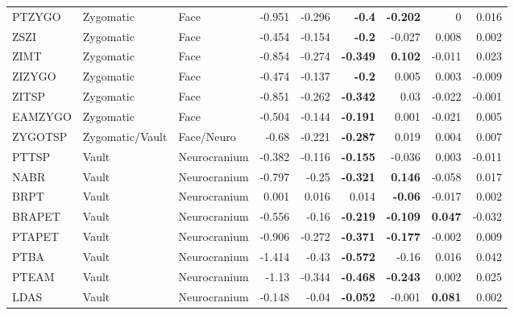 \documentclass [twocolumn, natbib, nospthms, 10pt] {svjour3}
\begin{document}
\begin{table*}[t]
\begin{tabular}{lllrrrrrr}
      PTZYGO & Zygomatic & Face & -0.951 & -0.296             & \textbf{-0.4}   & \textbf{-0.202} & 0              & 0.016            \\ 
      ZSZI & Zygomatic & Face & -0.454 & -0.154               & \textbf{-0.2}   & -0.027          & 0.008          & 0.002            \\ 
      ZIMT & Zygomatic & Face & -0.854 & -0.274               & \textbf{-0.349} & \textbf{0.102}  & -0.011         & 0.023            \\ 
      ZIZYGO & Zygomatic & Face & -0.474 & -0.137             & \textbf{-0.2}   & 0.005           & 0.003          & -0.009           \\ 
      ZITSP & Zygomatic & Face & -0.851 & -0.262              & \textbf{-0.342} & 0.03            & -0.022         & -0.001           \\ 
      EAMZYGO & Zygomatic & Face & -0.504 & -0.144            & \textbf{-0.191} & 0.001           & -0.021         & 0.005            \\ 
      ZYGOTSP & Zygomatic/Vault & Face/Neuro & -0.68 & -0.221 & \textbf{-0.287} & 0.019           & 0.004          & 0.007            \\ 
      PTTSP & Vault & Neurocranium & -0.382 & -0.116          & \textbf{-0.155} & -0.036          & 0.003          & -0.011           \\ 
      NABR & Vault & Neurocranium & -0.797 & -0.25            & \textbf{-0.321} & \textbf{0.146}  & -0.058         & 0.017            \\ 
      BRPT & Vault & Neurocranium & 0.001 & 0.016             & 0.014           & \textbf{-0.06}  & -0.017         & 0.002            \\ 
      BRAPET & Vault & Neurocranium & -0.556 & -0.16          & \textbf{-0.219} & \textbf{-0.109} & \textbf{0.047} & -0.032           \\ 
      PTAPET & Vault & Neurocranium & -0.906 & -0.272         & \textbf{-0.371} & \textbf{-0.177} & -0.002         & 0.009            \\ 
      PTBA & Vault & Neurocranium & -1.414 & -0.43            & \textbf{-0.572} & -0.16           & 0.016          & 0.042            \\ 
      PTEAM & Vault & Neurocranium & -1.13 & -0.344           & \textbf{-0.468} & \textbf{-0.243} & 0.002          & 0.025            \\ 
      LDAS & Vault & Neurocranium & -0.148 & -0.04            & \textbf{-0.052} & -0.001          & \textbf{0.081} & 0.002            \\ 

\end{tabular}
\end{table*}
\end{document}

